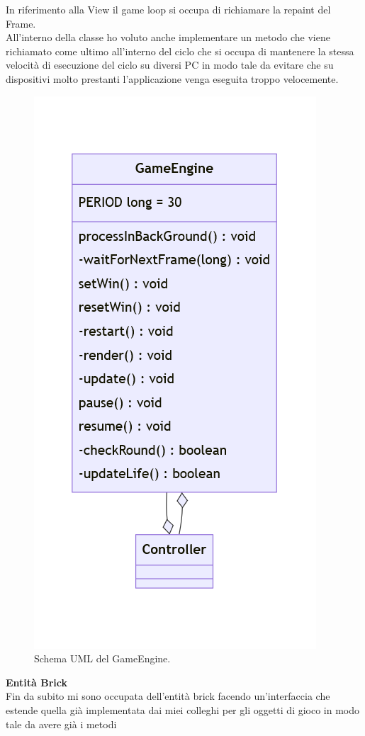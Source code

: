\documentclass[a4paper,12pt]{report}
\begin{document}
In riferimento alla View il game loop si occupa di richiamare la repaint del Frame.
\\All'interno della classe ho voluto anche implementare un metodo che viene richiamato come ultimo all'interno del ciclo che si occupa di mantenere
la stessa velocità di esecuzione del ciclo su diversi PC in modo tale da evitare che su dispositivi molto prestanti l'applicazione venga eseguita troppo velocemente.
\begin{figure}[H]
    \centering{}
    \includegraphics[scale=0.5]{images/GameEngine.png}
    \caption{Schema UML del GameEngine.}
    \label{images:GameEngine}
\end{figure}
\textbf{Entità Brick}\\
Fin da subito mi sono occupata dell'entità brick facendo un'interfaccia che estende quella già implementata dai miei colleghi per gli oggetti di gioco in modo tale da avere già i metodi
\end{document}
